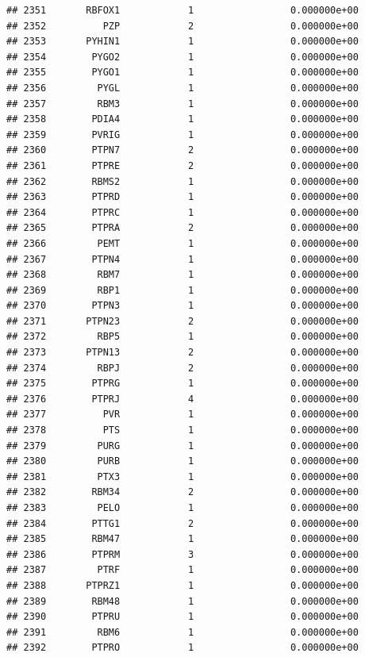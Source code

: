 \documentclass[
]{article}
\begin{document}
\begin{verbatim}
## 2351       RBFOX1            1                 0.000000e+00
## 2352          PZP            2                 0.000000e+00
## 2353       PYHIN1            1                 0.000000e+00
## 2354        PYGO2            1                 0.000000e+00
## 2355        PYGO1            1                 0.000000e+00
## 2356         PYGL            1                 0.000000e+00
## 2357         RBM3            1                 0.000000e+00
## 2358        PDIA4            1                 0.000000e+00
## 2359        PVRIG            1                 0.000000e+00
## 2360        PTPN7            2                 0.000000e+00
## 2361        PTPRE            2                 0.000000e+00
## 2362        RBMS2            1                 0.000000e+00
## 2363        PTPRD            1                 0.000000e+00
## 2364        PTPRC            1                 0.000000e+00
## 2365        PTPRA            2                 0.000000e+00
## 2366         PEMT            1                 0.000000e+00
## 2367        PTPN4            1                 0.000000e+00
## 2368         RBM7            1                 0.000000e+00
## 2369         RBP1            1                 0.000000e+00
## 2370        PTPN3            1                 0.000000e+00
## 2371       PTPN23            2                 0.000000e+00
## 2372         RBP5            1                 0.000000e+00
## 2373       PTPN13            2                 0.000000e+00
## 2374         RBPJ            2                 0.000000e+00
## 2375        PTPRG            1                 0.000000e+00
## 2376        PTPRJ            4                 0.000000e+00
## 2377          PVR            1                 0.000000e+00
## 2378          PTS            1                 0.000000e+00
## 2379         PURG            1                 0.000000e+00
## 2380         PURB            1                 0.000000e+00
## 2381         PTX3            1                 0.000000e+00
## 2382        RBM34            2                 0.000000e+00
## 2383         PELO            1                 0.000000e+00
## 2384        PTTG1            2                 0.000000e+00
## 2385        RBM47            1                 0.000000e+00
## 2386        PTPRM            3                 0.000000e+00
## 2387         PTRF            1                 0.000000e+00
## 2388       PTPRZ1            1                 0.000000e+00
## 2389        RBM48            1                 0.000000e+00
## 2390        PTPRU            1                 0.000000e+00
## 2391         RBM6            1                 0.000000e+00
## 2392        PTPRO            1                 0.000000e+00

\end{verbatim}
\end{document}
